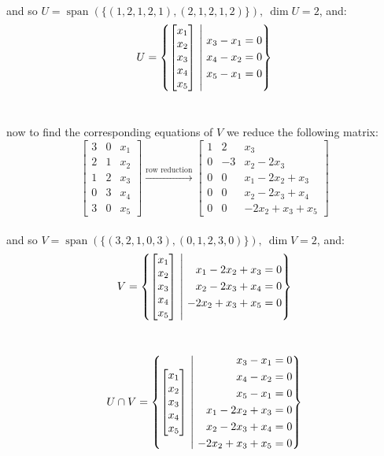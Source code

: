 \documentclass[a4paper,12pt]{article}
\DeclareMathOperator{\spn}{span}
\begin{document}
\begin{definition}
\begin{my_example}
\begin{step}
\[\]\\
and so \(U=\spn(\{(1,2,1,2,1),(2,1,2,1,2)\}),\ \dim U = 2\), and:\\
\[
U = \left\{\bmqty{x_1\\x_2\\x_3\\x_4\\x_5} \ \middle|\ \begin{aligned} x_3-x_1=0\\ x_4-x_2=0\\ x_5-x_1=0 \end{aligned}\right\}
\]\\
\end{step}
\begin{step}
now to find the corresponding equations of \(V\) we reduce the following matrix:\\
\[
\left[\begin{array}{cc|c} 3 & 0 & x_1\\ 2 & 1 & x_2\\ 1 & 2 & x_3\\ 0 & 3 & x_4\\ 3 & 0 & x_5 \end{array}\right] \xrightarrow{\text{row reduction}} \left[\begin{array}{cc|c} 1 & 2 & x_3\\ 0 & -3 & x_2-2x_3\\ 0 & 0 & x_1-2x_2+x_3\\ 0 & 0 & x_2-2x_3+x_4\\ 0 & 0 & -2x_2+x_3+x_5 \end{array}\right]
\]\\
and so \(V=\spn(\{(3,2,1,0,3),(0,1,2,3,0)\}),\ \dim V = 2\), and:\\
\[
  V = \left\{\bmqty{x_1\\x_2\\x_3\\x_4\\x_5} \ \middle|\ \begin{aligned} x_1-2x_2+x_3=0\\ x_2-2x_3+x_4=0\\ -2x_2+x_3+x_5=0 \end{aligned}\right\}
\]\\
\end{step}
\begin{step}
\[
  U \cap V = \left\{\bmqty{x_1\\x_2\\x_3\\x_4\\x_5} \ \middle|\ \begin{aligned} x_3-x_1=0\\ x_4-x_2=0\\ x_5-x_1=0\\ x_1-2x_2+x_3=0\\ x_2-2x_3+x_4=0\\ -2x_2+x_3+x_5=0 \end{aligned}\right\}
\]
\end{step}
\end{my_example}
\end{definition}
\end{document}
